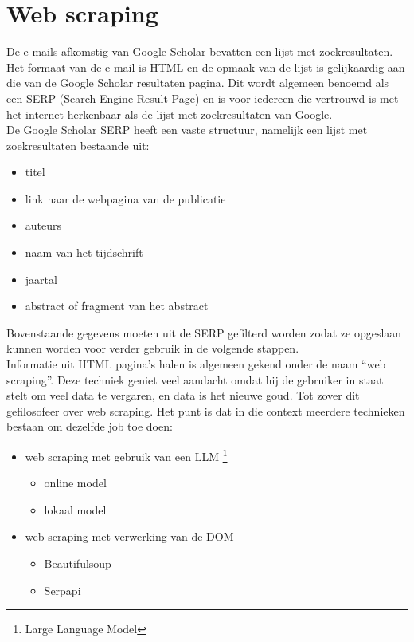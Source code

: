 \section{Web scraping}
De e-mails afkomstig van Google Scholar bevatten een lijst met zoekresultaten. Het formaat van de e-mail is HTML en de opmaak van de lijst is gelijkaardig aan die van de Google Scholar resultaten pagina. Dit wordt algemeen benoemd als een SERP (Search Engine Result Page) en is voor iedereen die vertrouwd is met het internet herkenbaar als de lijst met zoekresultaten van Google.\\
De Google Scholar SERP heeft een vaste structuur, namelijk een lijst met zoekresultaten bestaande uit:
\begin{itemize}
    \item titel
    \item link naar de webpagina van de publicatie
    \item auteurs
    \item naam van het tijdschrift
    \item jaartal
    \item abstract of fragment van het abstract
\end{itemize} 
Bovenstaande gegevens moeten uit de SERP gefilterd worden zodat ze opgeslaan kunnen worden voor verder gebruik in de volgende stappen.\\
Informatie uit HTML pagina's halen is algemeen gekend onder de naam ``web scraping''. Deze techniek geniet veel aandacht omdat hij de gebruiker in staat stelt om veel data te vergaren, en data is het nieuwe goud. Tot zover dit gefilosofeer over web scraping. Het punt is dat in die context meerdere technieken bestaan om dezelfde job toe doen:
\begin{itemize}
    \item web scraping met gebruik van een LLM \footnote{Large Language Model}
    \begin{itemize}
        \item online model
        \item lokaal model
    \end{itemize}
    \item web scraping met verwerking van de DOM
    \begin{itemize}
        \item Beautifulsoup
        \item Serpapi
    \end{itemize}
\end{itemize} 

